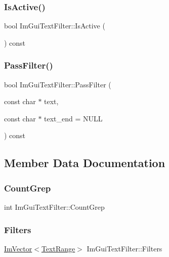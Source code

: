 \subsubsection{\texorpdfstring{Is\+Active()}{IsActive()}}
{\footnotesize\ttfamily bool Im\+Gui\+Text\+Filter\+::\+Is\+Active (\begin{DoxyParamCaption}{ }\end{DoxyParamCaption}) const}

\hypertarget{struct_im_gui_text_filter_a88d73ff8b81fbbd0a129b1bf3498d8aa}{}\label{struct_im_gui_text_filter_a88d73ff8b81fbbd0a129b1bf3498d8aa} 
\subsubsection{\texorpdfstring{Pass\+Filter()}{PassFilter()}}
{\footnotesize\ttfamily bool Im\+Gui\+Text\+Filter\+::\+Pass\+Filter (\begin{DoxyParamCaption}\item[{const char $\ast$}]{text,  }\item[{const char $\ast$}]{text\+\_\+end = {\ttfamily NULL} }\end{DoxyParamCaption}) const}



\subsection{Member Data Documentation}
\hypertarget{struct_im_gui_text_filter_ac31839c319fe4211c21fc143b7249f86}{}\label{struct_im_gui_text_filter_ac31839c319fe4211c21fc143b7249f86} 
\subsubsection{\texorpdfstring{Count\+Grep}{CountGrep}}
{\footnotesize\ttfamily int Im\+Gui\+Text\+Filter\+::\+Count\+Grep}

\hypertarget{struct_im_gui_text_filter_a5a930a339a9384e6bfadfa56a7c111fd}{}\label{struct_im_gui_text_filter_a5a930a339a9384e6bfadfa56a7c111fd} 
\subsubsection{\texorpdfstring{Filters}{Filters}}
{\footnotesize\ttfamily \hyperlink{class_im_vector}{Im\+Vector}$<$\hyperlink{struct_im_gui_text_filter_1_1_text_range}{Text\+Range}$>$ Im\+Gui\+Text\+Filter\+::\+Filters}

